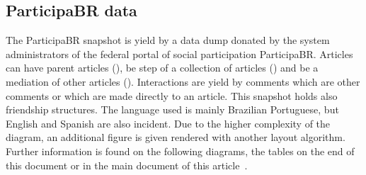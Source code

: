 \begin{apendicesenv}
															  \section{ParticipaBR data}
															  The ParticipaBR snapshot is yield by a data dump donated by the system
															  administrators of the federal portal of social participation ParticipaBR.
															  Articles can have parent articles (), be step of a
															  collection of articles () and be a mediation of other
															  articles ().
															  Interactions are yield by comments which are  other
															  comments or which are made directly to an article.
															  This snapshot holds also friendship structures.
															  The language used is mainly Brazilian Portuguese, but English and
															  Spanish are also incident.
															  Due to the higher complexity of the diagram, an additional figure is
															  given rendered with another layout algorithm.
															  Further information is found on the following diagrams, the tables on
															  the end of this document or in the main document of this
															  article~\cite{losd}.


\end{apendicesenv}
